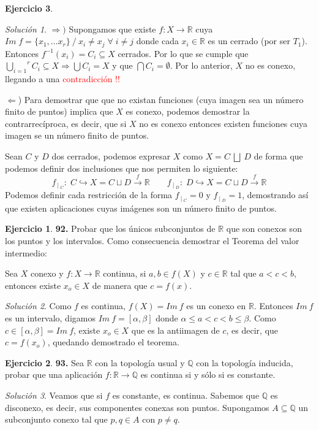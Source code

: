 \documentclass[12pt,twoside]{report}
\theoremstyle{azul}
\theoremstyle{azul2}
\theoremstyle{plain}
\theoremstyle{definition}
\newtheorem*{ejern}{Ejercicio}
\theoremstyle{remark}
\newtheorem*{sol}{Solución}
\begin{document}
\begin{ejern}
\begin{sol}
$\Rightarrow)$ Supongamos que existe $f: X \longrightarrow  \mathbb{R} $ cuya $Im \; f = \{ x_1, \ldots x_r \} \: / \: x_i \neq x_j \; \forall \; i \neq j$ donde cada $x_i \in \mathbb{R}$ es un cerrado (por ser $T_1$). Entonces $f^{-1}(x_i)=C_i \subseteq X$ cerrados. Por lo que se cumple que $\overset{r}{\underset{i=1}{\bigcup}} C_i \subseteq X \Rightarrow \bigcup C_i = X$ y que $\bigcap C_i = \emptyset$. Por lo anterior, $X$ no es conexo, llegando a una \textcolor{red}{contradicción !!}

$\Leftarrow$) Para demostrar que que no existan funciones (cuya imagen sea un n{\'u}mero finito de puntos) implica que $X$ es conexo, podemos demostrar la contrarrecíproca, es decir, que si $X$ no es conexo entonces existen funciones cuya imagen se un n{\'u}mero finito de puntos.

Sean $C$ y $D$ dos cerrados, podemos expresar $X$ como $X=C \: \bigsqcup \: D$ de forma que podemos definir dos inclusiones que nos permiten lo siguiente:
$$f_{\: |\: _ C}: \; C \hookrightarrow X = C \sqcup D \stackrel{f}{\longrightarrow} \mathbb{R} \qquad f_{\: | \:_D}: \; D \hookrightarrow X = C \sqcup D \stackrel{f}{\longrightarrow} \mathbb{R}$$
Podemos definir cada restricción de la forma $f_{\: |\: _ C}=0$ y $f_{\: |\: _ D}=1$, demostrando así que existen aplicaciones cuyas imágenes son un n{\'u}mero finito de puntos. 
\end{sol}
\; \vspace{-5mm}
\begin{ejern} \textbf{92.}
Probar que los {\'u}nicos subconjuntos de $\mathbb{R}$ que son conexos son los puntos y los intervalos. Como consecuencia
demostrar el Teorema del valor intermedio:

Sea $X$ conexo y $f : X \longrightarrow \mathbb{R}$ continua, si $a, b \in f(X)$ y $c \in \mathbb{R}$ tal que $a<c<b$, entonces existe $x_o \in X$ de manera que $c = f(x)$.
\end{ejern}
\begin{sol}
Como $f$ es continua, $f(X) = Im \: f$ es un conexo en $\mathbb{R}$. Entonces $Im \: f$ es un intervalo, digamos $Im \:f=[\alpha, \beta]$ donde $\alpha \leq a < c < b \leq \beta$. Como $c \in [\alpha, \beta]=Im \:f$, existe $x_o \in X$ que es la antiimagen de $c$, es decir, que $c=f(x_o)$, quedando demostrado el teorema. 
\end{sol}
\; \vspace{-5mm}
\begin{ejern}\textbf{93.}
Sea $\mathbb{R}$ con la topología usual y $\mathbb{Q}$ con la topología inducida, probar que una aplicación $f : \mathbb{R} \longrightarrow \mathbb{Q}$ es continua si y sólo si es constante.
\end{ejern}
\begin{sol}
Veamos que si $f$ es constante, es continua. Sabemos que $\mathbb{Q}$ es disconexo, es decir, sus componentes conexas son puntos. Supongamos $A \subseteq \mathbb{Q}$ un subconjunto conexo tal que $p,q \in A$ con $p \neq q$.


\end{sol}
\end{ejern}
\end{document}

